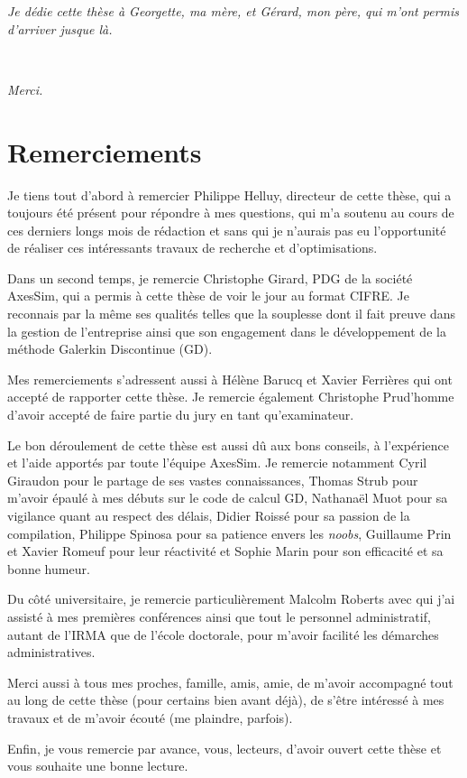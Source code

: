 \vspace*{\fill}
\begin{flushright}
\parbox{0.3\linewidth}{
  \textit{Je dédie cette thèse à Georgette,
    ma mère, et Gérard, mon père,
    qui m'ont permis d'arriver jusque là.}
}
\\
\parbox{0.3\linewidth}{
 \begin{flushright}
 \textit{Merci.}
 \end{flushright}
}
\end{flushright}
\vspace*{\fill}

\chapter*{Remerciements}


Je tiens tout d'abord à remercier
Philippe Helluy, directeur de cette thèse,
qui a toujours été présent pour répondre à mes questions,
qui m'a soutenu au cours de ces derniers longs mois de rédaction
et sans qui je n'aurais pas eu l'opportunité de réaliser
ces intéressants travaux de recherche et d'optimisations.

Dans un second temps, je remercie
Christophe Girard, PDG de la société AxesSim,
qui a permis à cette thèse de voir le jour au format CIFRE.
Je reconnais par la même ses qualités telles que la souplesse dont
il fait preuve dans la gestion de l'entreprise ainsi que son
engagement dans le développement de la méthode Galerkin Discontinue (GD).

Mes remerciements s'adressent aussi à Hélène Barucq et Xavier Ferrières
qui ont accepté de rapporter cette thèse.
Je remercie également Christophe Prud'homme
d'avoir accepté de faire partie du jury en tant qu'examinateur.

Le bon déroulement de cette thèse est aussi dû aux bons conseils,
à l'expérience et l'aide apportés par toute l'équipe AxesSim.
Je remercie notamment Cyril Giraudon pour le partage de ses vastes
connaissances,
Thomas Strub pour m'avoir épaulé à mes débuts sur le code de calcul GD,
Nathanaël Muot pour sa vigilance quant au respect des délais,
Didier Roissé pour sa passion de la compilation,
Philippe Spinosa pour sa patience envers les \textit{noobs},
Guillaume Prin et Xavier Romeuf pour leur réactivité
et Sophie Marin pour son efficacité et sa bonne humeur.

Du côté universitaire, je remercie particulièrement
Malcolm Roberts avec qui j'ai assisté à mes premières conférences
ainsi que tout le personnel administratif, autant de l'IRMA que
de l'école doctorale, pour m'avoir facilité les démarches administratives.

Merci aussi à tous mes proches, famille, amis, amie, de m'avoir
accompagné tout au long de cette thèse (pour certains bien avant déjà),
de s'être intéressé à mes travaux et de m'avoir écouté
(me plaindre, parfois).

Enfin, je vous remercie par avance, vous, lecteurs, d'avoir ouvert
cette thèse et vous souhaite une bonne lecture.

